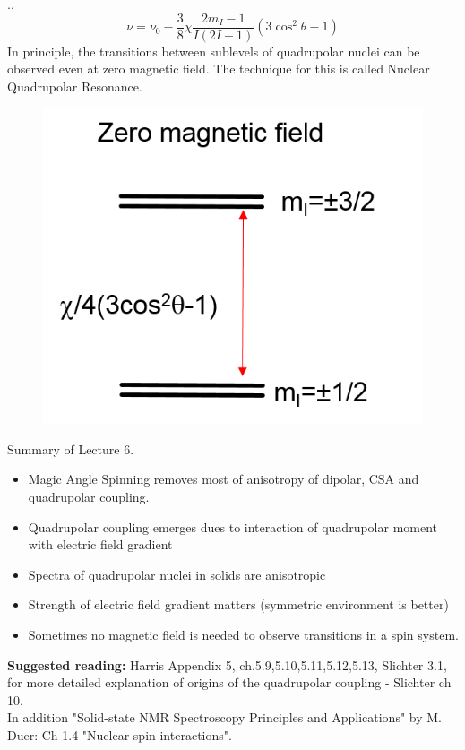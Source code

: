 \documentclass[handout]{beamer}
\begin{document}
\begin{frame}{\thesection.\thesubsection. \insertsubsection}
	\begin{equation}
	\nu = \nu_0 -\dfrac{3}{8} \chi \dfrac{2 m_I -1}{I(2I -1)}(3 \cos^2 \theta - 1)
	\end{equation}
	In principle, the transitions between sublevels of quadrupolar nuclei can be observed even at zero magnetic field. The technique for this is called \alert{Nuclear Quadrupolar Resonance}.
	\begin{figure}
		\centering
		\includegraphics[scale=0.5]{Quadrupole_ZF.png}
	\end{figure}
\end{frame}

\begin{frame}{Summary of Lecture 6.}
	\begin{itemize}[<+>]
		\item 	Magic Angle Spinning removes most of anisotropy of dipolar, CSA and quadrupolar coupling.
		\item Quadrupolar coupling emerges dues to interaction of quadrupolar moment with electric field gradient
		\item Spectra of quadrupolar nuclei in solids are anisotropic
		\item Strength of electric field gradient matters (symmetric environment is better)
		\item Sometimes no magnetic field is needed to observe transitions in a spin system.
	\end{itemize}
	
    \textbf{Suggested reading:}  Harris  Appendix 5, ch.5.9,5.10,5.11,5.12,5.13, Slichter 3.1, for more detailed explanation of origins of the quadrupolar coupling - Slichter ch 10.\\
    In addition "Solid-state NMR Spectroscopy Principles and Applications" by M. Duer: Ch 1.4 "Nuclear spin interactions".
    
\end{frame}
\end{document}
